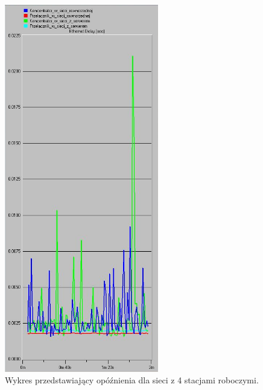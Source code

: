 \documentclass{article}
\begin{document}
\begin{figure}[H]
  \centering
  \includegraphics[width=0.60\textwidth]{screens/4_delay.png}
 \caption{Wykres przedstawiający opóźnienia dla sieci z 4 stacjami roboczymi.}
 \label{fig:4stacjed}
\end{figure}
\end{document}
